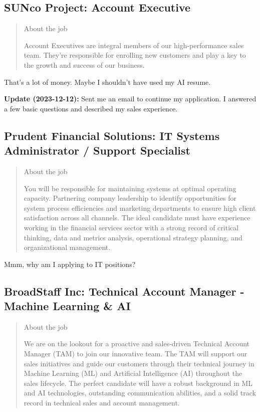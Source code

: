 \documentclass[
	letterpaper, %
	12pt, %
]{CSSullivanBusinessReport}
\begin{document}

\subsection[SUNco Project]{SUNco Project: Account Executive}

\begin{quote}
	About the job
	
	Account Executives are integral members of our high-performance sales team. They're responsible for enrolling new customers and play a key to the growth and success of our business.

\end{quote}

That's a lot of money. Maybe I shouldn't have used my AI resume. 

\textbf{Update (2023-12-12):} Sent me an email to continue my application. I answered a few basic questions and described my sales experience. 


\subsection[Prudent Financial Solutions]{Prudent Financial Solutions: IT Systems Administrator / Support Specialist}

\begin{quote}
	About the job
	
	You will be responsible for maintaining systems at optimal operating capacity. Partnering company leadership to identify opportunities for system process efficiencies and marketing departments to ensure high client satisfaction across all channels. The ideal candidate must have experience working in the financial services sector with a strong record of critical thinking, data and metrics analysis, operational strategy planning, and organizational management.

\end{quote}

Mmm, why am I applying to IT positions?


\subsection[BroadStaff Inc]{BroadStaff Inc: Technical Account Manager - Machine Learning \& AI}

\begin{quote}
	About the job
	
	We are on the lookout for a proactive and sales-driven Technical Account Manager (TAM) to join our innovative team. The TAM will support our sales initiatives and guide our customers through their technical journey in Machine Learning (ML) and Artificial Intelligence (AI) throughout the sales lifecycle. The perfect candidate will have a robust background in ML and AI technologies, outstanding communication abilities, and a solid track record in technical sales and account management. 

\end{quote}
\end{document}
